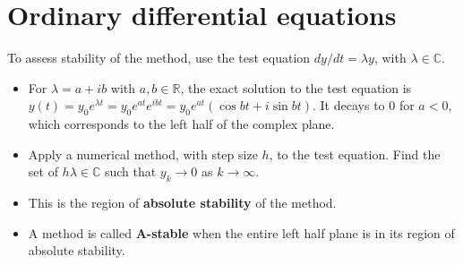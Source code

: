 \documentclass[12pt,letterpaper,noanswers]{exam}
\begin{document}
\section*{Ordinary differential equations}
\begin{tcolorbox}
To assess stability of the method, use the test equation $dy/dt = \lambda y$, with $\lambda \in \mathbb{C}$.
\begin{itemize}
\itemsep0pt
\item For $\lambda = a + ib$ with $a,b\in\mathbb{R}$, the exact solution to the test equation is $y(t) = y_0e^{\lambda t} = y_0e^{at}e^{ibt} = y_0e^{at}(\cos bt + i \sin bt)$.  It decays to $0$ for $a<0$, which corresponds to the left half of the complex plane.
    \item Apply a numerical method, with step size $h$, to the test equation.  Find the set of $h\lambda \in \mathbb{C}$ such that $y_k\rightarrow 0$ as $k\rightarrow\infty$.
    \item This is the region of \textbf{absolute stability} of the method.
    \item A method is called \textbf{A-stable} when the entire left half plane is in its region of absolute stability.
\end{itemize}
\end{tcolorbox}
\end{document}
